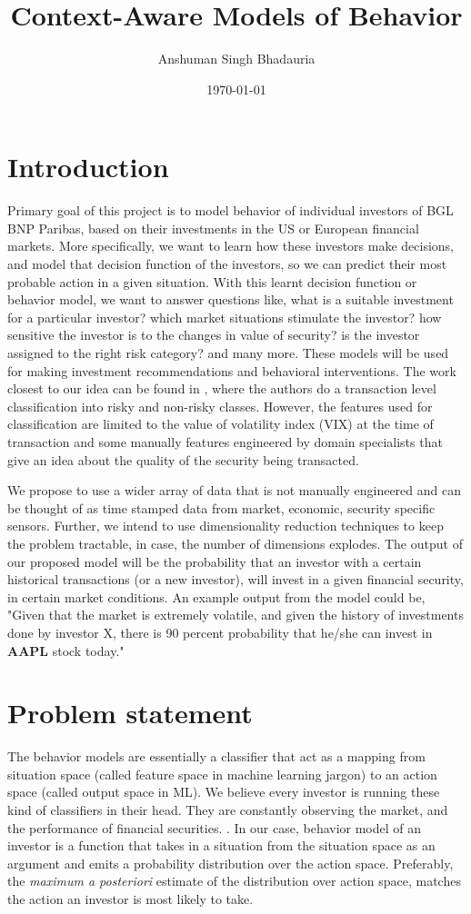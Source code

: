 \documentclass[a4paper]{article}
\title{Context-Aware Models of Behavior}
\author{Anshuman Singh Bhadauria}
\date{\today}
\begin{document}
\maketitle

\section{Introduction }
\label{sec:introduction}
Primary goal of this project is to model behavior of individual investors of BGL BNP Paribas, based on their investments in the US or European financial markets. More specifically, we want to learn how these investors make decisions, and model that decision function of the investors, so we can predict their most probable action in a given situation. With this learnt decision function or behavior model, we want to answer questions like, what is a suitable investment for a particular investor? which market situations stimulate the investor? how sensitive the investor is to the changes in value of security? is the investor assigned to the right risk category? and many more. These models will be used for making investment recommendations and behavioral interventions. The work closest to our idea can be found in \cite{Robin2012ModelingBehavior}, where the authors do a transaction level classification into risky and non-risky classes. However, the features used for classification are limited to the value of volatility index (VIX) at the time of transaction and some manually features engineered by domain specialists that give an idea about the quality of the security being transacted.

We propose to use a wider array of data that is not manually engineered and can be thought of as time stamped data from market, economic, security specific sensors. Further, we intend to use dimensionality reduction techniques to keep the problem tractable, in case, the number of dimensions explodes. The output of our proposed model will be the probability that an investor with a certain historical transactions (or a new investor), will invest in a given financial security, in certain market conditions. An example output from the model could be, "Given that the market is extremely volatile, and given the history of investments done by investor X, there is 90 percent probability that he/she can invest in \textbf{AAPL} stock today."

\section{Problem statement}
The behavior models are essentially a classifier that act as a mapping from situation space (called feature space in machine learning jargon) to an action space (called output space in ML). We believe every investor is running these kind of classifiers in their head. They are constantly observing the market, and the performance of financial securities. . In our case, behavior model of an investor is a function that takes in a situation from the situation space as an argument and emits a probability distribution over the action space. Preferably, the \textit{maximum a posteriori} estimate of the distribution over action space, matches the action an investor is most likely to take.
\end{document}

